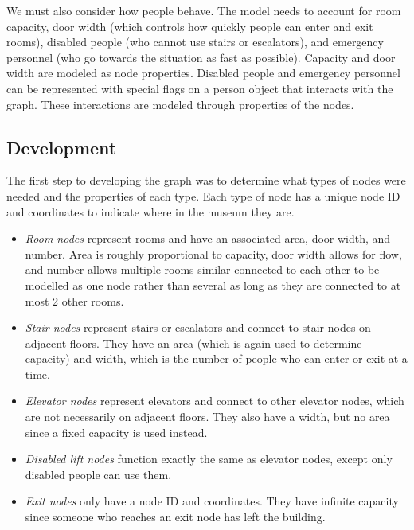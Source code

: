 \documentclass[12pt]{article}
\begin{document}
We must also consider how people behave. The model needs to account for room capacity, door width (which controls how quickly people can enter and exit rooms), disabled people (who cannot use stairs or escalators), and emergency personnel (who go towards the situation as fast as possible). Capacity and door width are modeled as node properties. Disabled people and emergency personnel can be represented with special flags on a person object that interacts with the graph. These interactions are modeled through properties of the nodes. 

\subsection{Development}
The first step to developing the graph was to determine what types of nodes were needed and the properties of each type. Each type of node has a unique node ID and coordinates to indicate where in the museum they are.
\begin{itemize}
\item \textit{Room nodes} represent rooms and have an associated area, door width, and number. Area is roughly proportional to capacity, door width allows for flow, and number allows multiple rooms similar connected to each other to be modelled as one node rather than several as long as they are connected to at most 2 other rooms.
\item \textit{Stair nodes} represent stairs or escalators and connect to stair nodes on adjacent floors. They have an area (which is again used to determine capacity) and width, which is the number of people who can enter or exit at a time.
\item \textit{Elevator nodes} represent elevators and connect to other elevator nodes, which are not necessarily on adjacent floors. They also have a width, but no area since a fixed capacity is used instead.
\item \textit{Disabled lift nodes} function exactly the same as elevator nodes, except only disabled people can use them.
\item \textit{Exit nodes} only have a node ID and coordinates. They have infinite capacity since someone who reaches an exit node has left the building.
\end{itemize}
\end{document}
